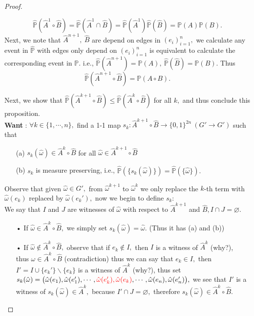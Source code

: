 \documentclass[12pt,a4paper]{report}
\theoremstyle{definition}
\begin{document}
\begin{enumerate}
\begin{proof}
\begin{center}
{{\begin{flushleft}
    \[
    \hat{\mathbb{P}}(\hat{A}^1\circ \hat{B})=\hat{\mathbb{P}}(\hat{A}^1\cap \hat{B})=\hat{\mathbb{P}}(\hat{A}^1)\hat{\mathbb{P}}(\hat{B})=\mathbb{P}(A)\mathbb{P}(B).
    \]
    \quad Next, we note that $\hat{A}^{n+1},\ \hat{B}$ are depend on edges in $(e_i)_{i=1}^n,$ we calculate any event in $\hat{\mathbb{P}}$ with edges only depend on $(e_i)_{i=1}^n$ is equivalent to calculate the corresponding event in $\mathbb{P}.$ i.e., $\hat{\mathbb{P}}(\hat{A}^{n+1})=\mathbb{P}(A),\ \hat{\mathbb{P}}(\hat{B})=\mathbb{P}(B).$ Thus
    \[
    \hat{\mathbb{P}}(\hat{A}^{n+1}\circ \hat{B})=\mathbb{P}(A\circ B).
    \]
    \end{flushleft}}
    }
    \end{center}
    Next, we show that $\hat{\mathbb{P}}(\hat{A}^{k+1}\circ \hat{B})\leq \hat{\mathbb{P}}(\hat{A}^k\circ\hat{B})$ for all $k,$ and thus conclude this proposition.\\[6pt]
    \textbf{Want} : $ \forall k\in \{1,\cdots ,n\},$ find a 1-1 map $s_k:\hat{A}^{k+1}\circ \hat{B}\to\{0,1\}^{2n}\ (G'\to G')$ such that
    \begin{enumerate}
        \item[(a)] $s_k(\hat{\omega})\in \hat{A}^k\circ \hat{B}$ for all $\hat{\omega}\in \hat{A}^{k+1}\circ \hat{B}$
        \item[(b)] $s_k$ is measure preserving, i.e., $\hat{\mathbb{P}}(\{s_k(\hat{\omega})\})=\hat{\mathbb{P}}(\{\hat{\omega}\}).$
    \end{enumerate}
    Observe that given $\hat{\omega}\in G',$ from $\hat{\omega}^{k+1}$ to $\hat{\omega}^{k}$ we only replace the $k$-th term with $\hat{\omega}(e_k)$ replaced by $\hat{\omega}(e_k'),$ now we begin to define $s_k:$\\[5pt]
    We say that $I$ and $J$ are witnesses of $\hat{\omega}$ with respect to $\hat{A}^{k+1}$ and $\hat{B}, I\cap J= \varnothing.$
    \begin{enumerate}
        \item[•] If $\hat{\omega}\in \hat{A}^k\circ \hat{B},$ we simply set $s_k(\hat{\omega})=\hat{\omega}.$ (Thus it has (a) and (b))
        \item[•] If $\hat{\omega}\notin \hat{A}^k\circ \hat{B},$ observe that if $e_k\notin I,$ then $I$ is a witness of $\hat{A}^k$ (why?),\\ thus $\omega\in \hat{A}^k\circ \hat{B}$ (contradiction) thus we can say that $e_k\in I,$ then \\$I'=I\cup \{e_k'\}\backslash\{e_k\}$ is a witness of $\hat{A}^k$ (why?), thus set\\ $s_k(\hat{\omega})=\big(\hat{\omega}(e_1),\hat{\omega}(e_1'),\cdots ,\textcolor{red}{\hat{\omega}(e_k'),\hat{\omega}(e_k)},\cdots , \hat{\omega}(e_n),\hat{\omega}(e_n')\big),$ we see that $I'$ is a witness of  $s_k(\hat{\omega})\in \hat{A}^k,$ because $I'\cap J=\varnothing,$ therefore $s_k(\hat{\omega})\in \hat{A}^k\circ \hat{B}.$

\end{enumerate}
\end{proof}
\end{enumerate}
\end{document}
